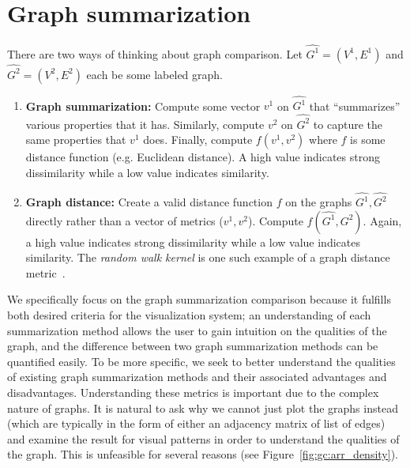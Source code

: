 \section{Graph summarization}
\label{sec:gc:litreview}

There are two ways of thinking about graph comparison. Let 
$\hat{G^1}=(V^1,E^1)$ and $\hat{G^2}=(V^2,E^2)$ each be some labeled graph. 

\tablespacing
\begin{enumerate}
	\item \textbf{Graph summarization:} Compute some vector 
	$v^1$ on $\hat{G^1}$ that ``summarizes'' various properties that
	it has. Similarly, compute $v^2$ on $\hat{G^2}$ to capture 
	the same properties that $v^1$ does. Finally, compute 
	$f(v^1,v^2)$ where $f$ is some distance 
	function (e.g. Euclidean distance). A high value indicates strong 
	dissimilarity while a low value indicates similarity. 
	
	\item \textbf{Graph distance:} Create a valid distance function $f$ on the 
	graphs $\hat{G^1}, \hat{G^2}$ directly rather than a vector of metrics 
	($v^1,v^2$). 
	Compute $f(\hat{G^1},\hat{G^2})$. Again, a high value indicates strong 
	dissimilarity while a low value indicates similarity. The \textit{random 
	walk kernel} is one such example of a graph distance 
	metric~\cite{vishwanathan2010}.
\end{enumerate}
\bodyspacing

We specifically focus on the graph summarization comparison because it 
fulfills both desired criteria for the visualization system; an understanding 
of each summarization method allows the user to gain intuition on the qualities 
of the graph, and the difference between two graph summarization methods can be 
quantified easily. To be more specific, we seek to better understand the 
qualities of existing graph summarization methods and their associated 
advantages and disadvantages. 
Understanding these metrics is important due to the complex nature of graphs.
It is natural to ask why we cannot just plot the graphs instead (which are 
typically in the form of either an adjacency matrix of list of edges) and 
examine the result for visual patterns in order to understand the qualities 
of the graph. This is unfeasible for several reasons (see 
Figure~\ref{fig:gc:arr_density}). 

